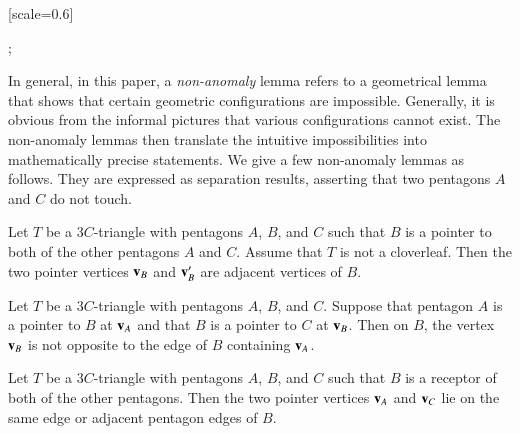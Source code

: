 {
[scale=0.6]
\begin{scope}[xshift=4cm]
;
\end{scope}
}


In general, in this paper, a {\it non-anomaly} lemma refers to a
geometrical lemma that shows that certain geometric configurations are
impossible.  Generally, it is obvious from the informal pictures that
various configurations cannot exist.  The non-anomaly lemmas then
translate the intuitive impossibilities into mathematically precise
statements.  We give a few non-anomaly lemmas as follows.
They are expressed as separation results, asserting that
two pentagons $A$ and $C$ do not touch.

\begin{lemma} 
Let $T$ be a $3C$-triangle with pentagons $A$, $B$, and $C$ such that
$B$ is a pointer to both of the other pentagons $A$ and $C$.  
Assume that $T$ is not a cloverleaf.
Then the two pointer vertices ${\mathbf v}_B$ and ${\mathbf v}_B'$ are adjacent
vertices of $B$.
\end{lemma}

\begin{lemma}  
Let $T$ be a $3C$-triangle with pentagons $A$, $B$, and $C$.
Suppose that pentagon
$A$ is a pointer to $B$ at ${\mathbf v}_A$ and that $B$ is a pointer to $C$
at ${\mathbf v}_B$.  Then on $B$, the vertex
${\mathbf v}_B$ is not opposite to the edge of $B$ containing
${\mathbf v}_A$.
\end{lemma}

\begin{lemma} 
Let $T$ be a $3C$-triangle with pentagons $A$, $B$, and $C$ 
such that $B$ is a receptor of both of
  the other pentagons.  Then the two pointer vertices
  ${\mathbf v}_A$ and ${\mathbf v}_C$ lie on the same edge or adjacent pentagon edges of
  $B$. 
\end{lemma}






